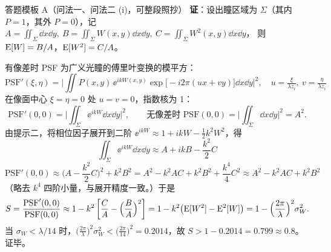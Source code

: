 \begin{exam}{答题模板 A（问法一、问法二 (i)，可整段照抄）}\label{ex:strehl-tplA}
\textbf{证}：设出瞳区域为 $\Sigma$（其内 $P=1$，其外 $P=0$），记
$A=\iint_\Sigma\dd x\dd y,\ B=\iint_\Sigma W(x,y)\dd x\dd y,\ C=\iint_\Sigma W^2(x,y)\dd x\dd y$，
则 $\mathrm{E}[W]=B/A$，$\mathrm{E}[W^2]=C/A$。

有像差时 PSF 为广义光瞳的傅里叶变换的模平方：
\[
\mathrm{PSF}'(\xi,\eta)=\Big|\iint P(x,y)\,\ee^{ikW(x,y)}\exp\!\big[-i2\pi(ux+vy)\big]\dd x\dd y\Big|^2,\quad u=\tfrac{\xi}{\lambda z_i},\ v=\tfrac{\eta}{\lambda z_i}
\]
在像面中心 $\xi=\eta=0$ 处 $u=v=0$，指数核为 1：
\[
\mathrm{PSF}'(0,0)=\Big|\iint_\Sigma\ee^{ikW}\dd x\dd y\Big|^2,\qquad\text{无像差时 }\mathrm{PSF}(0,0)=\Big|\iint_\Sigma\dd x\dd y\Big|^2=A^2 .
\]
由提示二，将相位因子展开到二阶 $\ee^{ikW}\approx1+ikW-\frac12k^2W^2$，得
\[
\iint_\Sigma\ee^{ikW}\dd x\dd y\approx A+ikB-\frac{k^2}{2}C
\]
\[
\mathrm{PSF}'(0,0)\approx\Big(A-\frac{k^2}{2}C\Big)^2+k^2B^2=A^2-k^2AC+k^2B^2+\frac{k^4}{4}C^2\approx A^2-k^2AC+k^2B^2
\]
（略去 $k^4$ 四阶小量，与展开精度一致。）于是
\[
S=\frac{\mathrm{PSF}'(0,0)}{\mathrm{PSF}(0,0)}\approx1-k^2\left[\frac{C}{A}-\Big(\frac{B}{A}\Big)^2\right]
=1-k^2\big(\mathrm{E}[W^2]-\mathrm{E}^2[W]\big)=1-\Big(\frac{2\pi}{\lambda}\Big)^2\sigma_W^2 .
\]
当 $\sigma_W<\lambda/14$ 时，$\big(\frac{2\pi}{\lambda}\big)^2\sigma_W^2<\big(\frac{2\pi}{14}\big)^2=0.2014$，故
$S>1-0.2014=0.799\approx0.8$。\hfill 证毕。
\end{exam}

